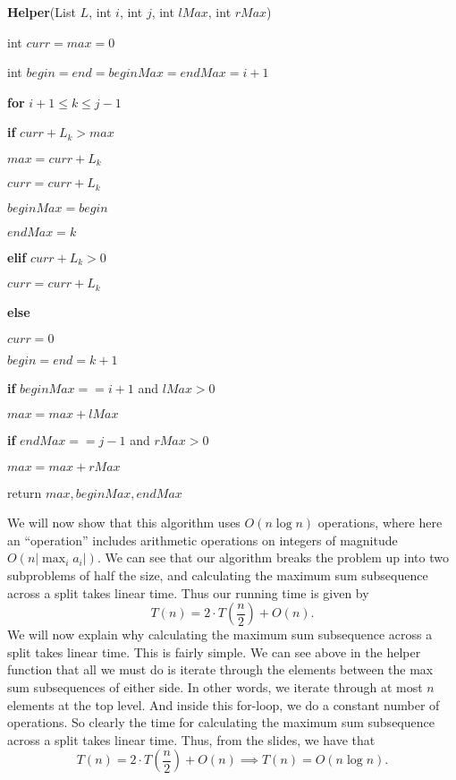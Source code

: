 \documentclass{article}
\begin{document}
\textbf{Helper}(List $L$, int $i$, int $j$, int $lMax$, int $rMax$)
\begin{enumerate}
    \item int $curr = max = 0$
    \item int $begin = end = beginMax = endMax = i+1$
    \item \textbf{for} $i+1 \leq k \leq j-1$
    {\setlength\itemindent{25pt} \item \textbf{if} $curr + L_k > max$ }
    {\setlength\itemindent{50pt} \item $max = curr + L_k$ }
    {\setlength\itemindent{50pt} \item $curr = curr + L_k$ }
    {\setlength\itemindent{50pt} \item $beginMax = begin$ }
    {\setlength\itemindent{50pt} \item $endMax = k$ }
    {\setlength\itemindent{25pt} \item \textbf{elif} $curr + L_k > 0$ }
    {\setlength\itemindent{50pt} \item $curr = curr + L_k$ }
    {\setlength\itemindent{25pt} \item \textbf{else} }
    {\setlength\itemindent{50pt} \item $curr = 0$ }
    {\setlength\itemindent{50pt} \item $begin = end = k+1$ }
    \item \textbf{if} $beginMax == i + 1$ and $lMax > 0$
    {\setlength\itemindent{25pt} \item $max = max + lMax$ }
    \item \textbf{if} $endMax == j - 1$ and $rMax > 0$
    {\setlength\itemindent{25pt} \item $max = max + rMax$ }
    \item return $max, beginMax, endMax$
\end{enumerate}

\vspace{5mm}
We will now show that this algorithm uses $O(n\log n)$ operations, where here
an ``operation'' includes arithmetic operations on integers of magnitude $O(n|\max_i a_i|)$.
We can see that our algorithm breaks the problem up into two subproblems of half
the size, and calculating the maximum sum subsequence across a split takes linear
time. Thus our running time is given by
\[ T(n) = 2 \cdot T(\frac{n}{2}) + O(n). \]
We will now explain why calculating the maximum sum subsequence across a split
takes linear time. This is fairly simple. We can see above in the helper
function that all we must do is iterate through the elements between the max sum
subsequences of either side. In other words, we iterate through at most $n$
elements at the top level. And inside this for-loop, we do a constant number of
operations. So clearly the time for calculating the maximum sum subsequence across a
split takes linear time. Thus, from the slides, we have that
\[ T(n) = 2 \cdot T(\frac{n}{2}) + O(n) \implies T(n) = O(n \log n). \]
\end{document}

